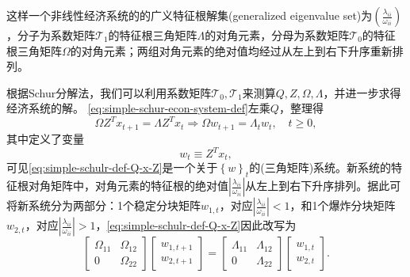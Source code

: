这样一个非线性经济系统的的广义特征根解集(generalized eigenvalue set)为$\left( \frac{\lambda_{ii}}{\omega_{ii}} \right)$，分子为系数矩阵$\mathcal{T}_1$的特征根三角矩阵$\Lambda$的对角元素，分母为系数矩阵$\mathcal{T}_0$的特征根三角矩阵$\Omega$的对角元素；两组对角元素的绝对值均经过从左上到右下升序重新排列。

根据Schur分解法，我们可以利用系数矩阵$\mathcal{T}_0, \mathcal{T}_1$来测算$Q, Z, \Omega, \Lambda$，并进一步求得经济系统的解。
\eqref{eq:simple-schur-econ-system-def}左乘$Q$，整理得
\begin{equation}
  \label{eq:simple-schulr-def-Q-x-Z}
  \Omega Z^T x_{t+1} = \Lambda Z^T x_t \Rightarrow \Omega w_{t+1} = \Lambda_t w_t, \quad t \ge 0,
\end{equation}
其中定义了变量
\begin{equation}
  \label{eq:simple-schur-def-w-x-Z}
  w_t \equiv Z^T x_t,
\end{equation}
可见\eqref{eq:simple-schulr-def-Q-x-Z}是一个关于$\left\{ w \right\}_{t}$的(三角矩阵)系统。新系统的特征根对角矩阵中，对角元素的特征根的绝对值$\left| \frac{\lambda_{ii}}{\omega_{ii}} \right|$从左上到右下升序排列。据此可将新系统分为两部分：1个稳定分块矩阵$w_{1,t}$，对应$\left| \frac{\lambda_{ii}}{\omega_{ii}} \right| < 1$，和1个爆炸分块矩阵$w_{2,t}$，对应$\left| \frac{\lambda_{ii}}{\omega_{ii}} \right| >1$，\eqref{eq:simple-schulr-def-Q-x-Z}因此改写为
\begin{equation}
  \label{eq:simple-schulr-def-Q-x-Z-decomp}
  \begin{bmatrix}
    \Omega_{11} & \Omega_{12} \\
    0 & \Omega_{22}
  \end{bmatrix} \begin{bmatrix}
  w_{1,t+1} \\ w_{2,t+1}
\end{bmatrix} = \begin{bmatrix}
    \Lambda_{11} & \Lambda_{12} \\
    0 & \Lambda_{22}
\end{bmatrix} \begin{bmatrix}
w_{1,t} \\ w_{2,t}
\end{bmatrix}.
\end{equation}

